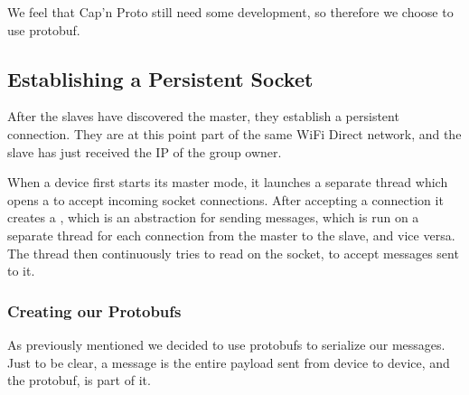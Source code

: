 We feel that Cap'n Proto still need some development, so therefore we choose to use protobuf.

\subsection{Establishing a Persistent Socket}

After the slaves have discovered the master, they establish a persistent connection.
They are at this point part of the same WiFi Direct network, and the slave has just received the IP of the group owner.

When a device first starts its master mode, it launches a separate thread which opens a  to accept incoming socket connections.
After accepting a connection it creates a , which is an abstraction for sending messages, which is run on a separate thread for each connection from the master to the slave, and vice versa.
The thread then continuously tries to read on the socket, to accept messages sent to it.

\subsubsection*{Creating our Protobufs}
As previously mentioned we decided to use protobufs to serialize our messages.
Just to be clear, a message is the entire payload sent from device to device, and the protobuf, is part of it.

